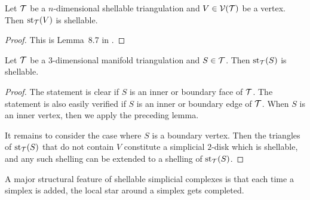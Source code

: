 \documentclass[10pt,letterpaper]{article}
\begin{document}
\begin{lemma}\label{lemma:stars_are_shellable}
    Let ${\mathcal T}$ be a $n$-dimensional shellable triangulation and $V \in {\mathcal V}({\mathcal T})$ be a vertex.
    Then $\operatorname{st}_{{\mathcal T}}(V)$ is shellable. 
\end{lemma}
\begin{proof}
    This is Lemma~8.7 in \cite{ziegler2012lectures}.
\end{proof}


\begin{lemma}
    Let ${\mathcal T}$ be a $3$-dimensional manifold triangulation and $S \in {\mathcal T}$.
    Then $\operatorname{st}_{{\mathcal T}}(S)$ is shellable. 
\end{lemma}
\begin{proof}
    The statement is clear if $S$ is an inner or boundary face of ${\mathcal T}$. 
    The statement is also easily verified if $S$ is an inner or boundary edge of ${\mathcal T}$.
    When $S$ is an inner vertex, then we apply the preceding lemma. 
    
    It remains to consider the case where $S$ is a boundary vertex. 
    Then the triangles of $\operatorname{st}_{{\mathcal T}}(S)$ that do not contain $V$ constitute a simplicial $2$-disk 
    which is shellable,
    and any such shelling can be extended to a shelling of $\operatorname{st}_{{\mathcal T}}(S)$.
\end{proof}


A major structural feature of shellable simplicial complexes 
is that each time a simplex is added, the local star around a simplex gets completed. 
\end{document}
